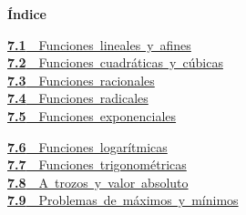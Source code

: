 \documentclass[11pt,a4paper]{article}
\begin{document}
\begin{tcolorbox}[colback=fmsurface,colframe=fmsurface,arc=3mm,left=4mm,right=4mm,top=2mm,bottom=2mm]
\small\textbf{Índice}\par\smallskip
\begin{minipage}[t]{0.49\linewidth}\small \mbox{\hyperlink{sec1}{\textbf{\color{fmgreen}7.1}\ \ Funciones lineales y afines}}\\[3pt]
\mbox{\hyperlink{sec2}{\textbf{\color{fmgreen}7.2}\ \ Funciones cuadráticas y cúbicas}}\\[3pt]
\mbox{\hyperlink{sec3}{\textbf{\color{fmgreen}7.3}\ \ Funciones racionales}}\\[3pt]
\mbox{\hyperlink{sec4}{\textbf{\color{fmgreen}7.4}\ \ Funciones radicales}}\\[3pt]
\mbox{\hyperlink{sec5}{\textbf{\color{fmgreen}7.5}\ \ Funciones exponenciales}}\\[3pt]\end{minipage}\hfill\begin{minipage}[t]{0.49\linewidth}\small \mbox{\hyperlink{sec6}{\textbf{\color{fmgreen}7.6}\ \ Funciones logarítmicas}}\\[3pt]
\mbox{\hyperlink{sec7}{\textbf{\color{fmgreen}7.7}\ \ Funciones trigonométricas}}\\[3pt]
\mbox{\hyperlink{sec8}{\textbf{\color{fmgreen}7.8}\ \ A trozos y valor absoluto}}\\[3pt]
\mbox{\hyperlink{sec9}{\textbf{\color{fmgreen}7.9}\ \ Problemas de máximos y mínimos}}\\[3pt]\end{minipage}
\end{tcolorbox}

\Needspace{5.7cm}
\end{document}
